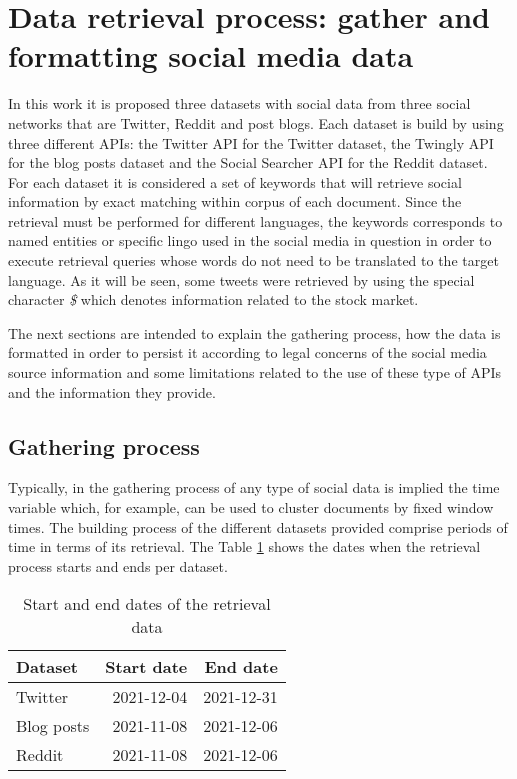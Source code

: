\section{Data retrieval process: gather and formatting social media data}

In this work it is proposed three datasets with social data from three social networks that are Twitter, Reddit and post blogs. Each dataset is build by using three different APIs: the Twitter API for the Twitter dataset, the Twingly API for the blog posts dataset and the Social Searcher API for the Reddit dataset. For each dataset it is considered a set of keywords that will retrieve social information by exact matching within corpus of each document. Since the retrieval must be performed for different languages, the keywords corresponds to named entities or specific lingo used in the social media in question in order to execute retrieval queries whose words do not need to be translated to the target language. As it will be seen, some tweets were retrieved by using the special character \textit{\$} which denotes information related to the stock market.

\par The next sections are intended to explain the gathering process, how the data is formatted in order to persist it according to legal concerns of the social media source information and some limitations related to the use of these type of APIs and the information they provide.
\subsection{Gathering process}
Typically, in the gathering process of any type of social data is implied the time variable which, for example,  can be used to cluster documents by fixed window times. The building process of the different datasets provided comprise periods of time in terms of its retrieval. The Table \ref{table:periodTime} shows the dates when the retrieval process starts and ends per dataset.

\begin{table}[htb]
	\begin{center}
		\begin{tabular}{|l|r|r|}
			\hline
			\textbf{Dataset} &    \textbf{Start date } &\textbf{ End date}\\
			\hline \hline
			Twitter              &  2021-12-04  &  2021-12-31\\ 
			\hline
			Blog posts &  2021-11-08 	& 2021-12-06 \\
			\hline
			Reddit &  2021-11-08   	& 2021-12-06 \\
			\hline
		\end{tabular}
	\end{center}
	\caption{Start and end dates of the retrieval data}
	\label{table:periodTime}
\end{table}

